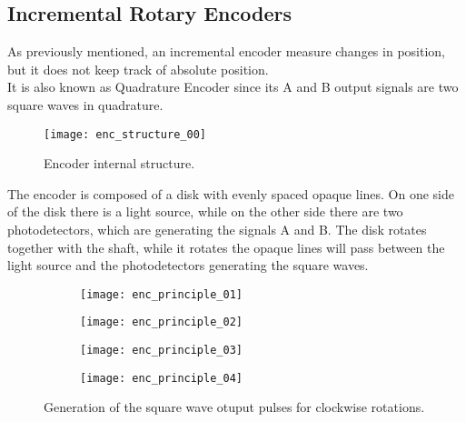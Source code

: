 \subsection{Incremental Rotary Encoders}\label{encoders_how_they_work}

As previously mentioned, an incremental encoder measure changes in position, but it does not keep track of absolute position.\\
It is also known as Quadrature Encoder since its A and B output signals are two square waves in quadrature.


\begin{figure}[!ht]
	\texttt{[image: enc\_structure\_00]}
	\captionsetup{justification=centering, margin=1.5cm}
	\centering
	\caption{Encoder internal structure.}
	\centering
\end{figure}

The encoder is composed of a disk with evenly spaced opaque lines. On one side of the disk there is a light source, while on the other side there are two photodetectors, which are generating the signals A and B. The disk rotates together with the shaft, while it rotates the opaque lines will pass between the light source and the photodetectors generating the square waves.



\begin{figure}[htb]
 \centering
	\begin{subfigure}{0.2\textwidth}
		\texttt{[image: enc\_principle\_01]}
	\end{subfigure}\hfil
	\begin{subfigure}{0.2\textwidth}
		\texttt{[image: enc\_principle\_02]}
	\end{subfigure}\hfil
	\begin{subfigure}{0.2\textwidth}
		\texttt{[image: enc\_principle\_03]}
	\end{subfigure}\hfil
	\begin{subfigure}{0.2\textwidth}
		\texttt{[image: enc\_principle\_04]}
	\end{subfigure}
	\captionsetup{justification=centering, margin=1.5cm}
	\caption{Generation of the square wave otuput pulses for clockwise rotations.}
\end{figure}

